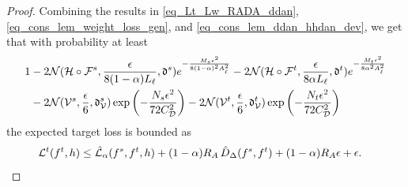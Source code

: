 \documentclass[review,supplement,onefignum,onetabnum]{siamonline250211}
\begin{document}
\begin{proof}
Combining the results in \eqref{eq_Lt_Lw_RADA_ddan}, \eqref{eq_cons_lem_weight_loss_gen}, and \eqref{eq_cons_lem_ddan_hhdan_dev}, we get that with probability at least
%
\begin{equation}
\label{eq_prob_exp_thm4}
\begin{split}
1 &-2 \mathcal{N}( \mathcal{H} \circ \mathcal{F}^s, \frac{\epsilon}{8 (1-\alpha) L_\ell}, \mathfrak{d}^s) e^{-\frac{M_s \epsilon^2}{8 (1-\alpha)^2 A_\ell^2}} 
- 2 \mathcal{N}( \mathcal{H} \circ \mathcal{F}^t, \frac{\epsilon}{8 \alpha L_\ell}, \mathfrak{d}^t) e^{-\frac{M_t \epsilon^2}{8 \alpha^2 A_\ell^2}} 
\\
&- 2 \mathcal{N}(\mathcal{V}^s, \frac{\epsilon}{6}, \mathfrak{d}^s_{\mathcal{V}} )  \exp \left( -\frac{N_s \epsilon^2}{72 {C^2_{\mathcal{D}}}} \right) 
- 2 \mathcal{N}(\mathcal{V}^t, \frac{\epsilon}{6}, \mathfrak{d}^t_{\mathcal{V}} ) \exp \left( -\frac{N_t \epsilon^2}{72 {C^2_{\mathcal{D}}}} \right) 
\end{split}
\end{equation}
%
the expected target loss is bounded as
%
\begin{equation*}
\begin{split}
\mathcal{L}^t(f^t, h) & \leq \hat{\mathcal{L}}_{\alpha}(f^s, f^t, h)+ (1-\alpha) R_{A} \, \hat{D}_{\Delta}(f^s, f^t) 
 + (1- \alpha) R_{A} \epsilon +  \epsilon.
\end{split}
\end{equation*}
%


\end{proof}
\end{document}
